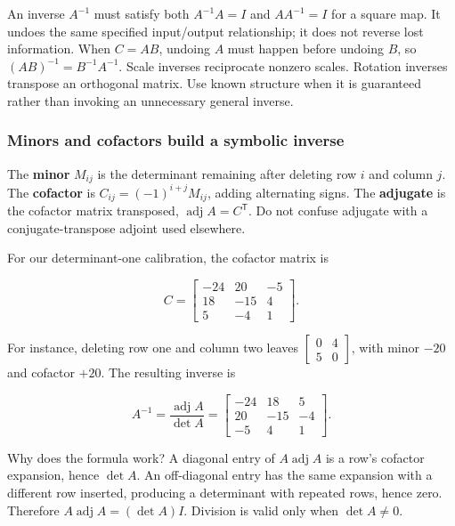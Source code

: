 \hypertarget{01-foundations-i-ch018-recovering-an-input-has-an-algebraic-route-and-a-computational-route}{}

An inverse \(A^{-1}\) must satisfy both \(A^{-1}A=I\) and \(AA^{-1}=I\) for a square map. It undoes the same specified input/output relationship; it does not reverse lost information. When \(C=AB\), undoing \(A\) must happen before undoing \(B\), so \((AB)^{-1}=B^{-1}A^{-1}\). Scale inverses reciprocate nonzero scales. Rotation inverses transpose an orthogonal matrix. Use known structure when it is guaranteed rather than invoking an unnecessary general inverse.

\subsubsection{Minors and cofactors build a symbolic inverse}\label{01-foundations-i-ch018-minors-and-cofactors-build-a-symbolic-inverse}

\hypertarget{01-foundations-i-ch018-minors-and-cofactors-build-a-symbolic-inverse}{}

The \textbf{minor} \(M_{ij}\) is the determinant remaining after deleting row \(i\) and column \(j\). The \textbf{cofactor} is \(C_{ij}=(-1)^{i+j}M_{ij}\), adding alternating signs. The \textbf{adjugate} is the cofactor matrix transposed, \(\operatorname{adj}A=C^{\mathsf T}\). Do not confuse adjugate with a conjugate-transpose adjoint used elsewhere.

For our determinant-one calibration, the cofactor matrix is

\[
C=\begin{bmatrix}-24&20&-5\\18&-15&4\\5&-4&1\end{bmatrix}.
\]

For instance, deleting row one and column two leaves \(\begin{bmatrix}0&4\\5&0\end{bmatrix}\), with minor \(-20\) and cofactor \(+20\). The resulting inverse is

\[
A^{-1}=\frac{\operatorname{adj}A}{\det A}
=\begin{bmatrix}-24&18&5\\20&-15&-4\\-5&4&1\end{bmatrix}.
\]

Why does the formula work? A diagonal entry of \(A\operatorname{adj}A\) is a row's cofactor expansion, hence \(\det A\). An off-diagonal entry has the same expansion with a different row inserted, producing a determinant with repeated rows, hence zero. Therefore \(A\operatorname{adj}A=(\det A)I\). Division is valid only when \(\det A\ne0\).

